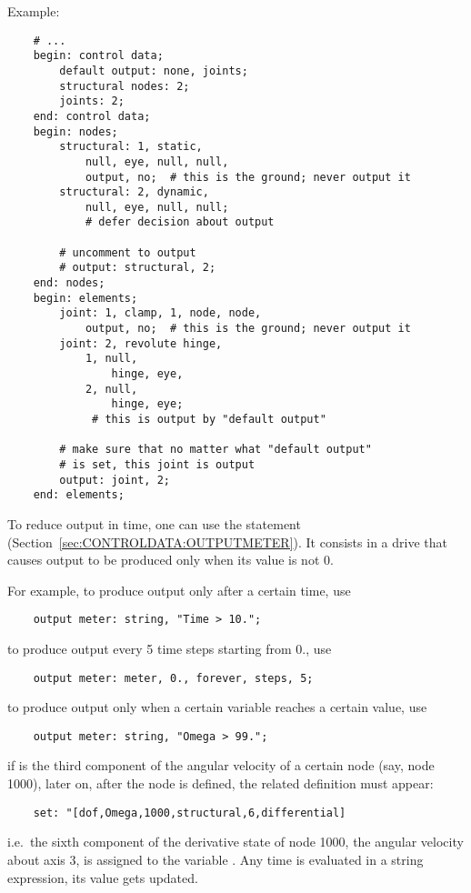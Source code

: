 \noindent
Example:
\begin{verbatim}
    # ...
    begin: control data;
        default output: none, joints;
        structural nodes: 2;
        joints: 2;
    end: control data;
    begin: nodes;
        structural: 1, static,
            null, eye, null, null,
            output, no;  # this is the ground; never output it
        structural: 2, dynamic,
            null, eye, null, null;
            # defer decision about output

        # uncomment to output
        # output: structural, 2;
    end: nodes;
    begin: elements;
        joint: 1, clamp, 1, node, node,
            output, no;  # this is the ground; never output it
        joint: 2, revolute hinge,
            1, null,
                hinge, eye,
            2, null,
                hinge, eye;
             # this is output by "default output"

        # make sure that no matter what "default output"
        # is set, this joint is output
        output: joint, 2;
    end: elements;
\end{verbatim}

To reduce output in time, one can use the  statement
(Section~\ref{sec:CONTROLDATA:OUTPUTMETER}).
It consists in a drive that causes output to be produced only when 
its value is not 0.

For example, to produce output only after a certain time, use
\begin{verbatim}
    output meter: string, "Time > 10.";
\end{verbatim}
to produce output every 5 time steps starting from 0., use
\begin{verbatim}
    output meter: meter, 0., forever, steps, 5;
\end{verbatim}
to produce output only when a certain variable reaches a certain value, use
\begin{verbatim}
    output meter: string, "Omega > 99.";
\end{verbatim}
if  is the third component of the angular velocity 
of a certain node (say, node 1000), later on, after the node is defined, 
the related definition must appear:
\begin{verbatim}
    set: "[dof,Omega,1000,structural,6,differential]
\end{verbatim}
i.e.\ the sixth component of the derivative state of node 1000,
the angular velocity about axis 3, is assigned to the variable .
Any time  is evaluated in a string expression, its value
gets updated.

